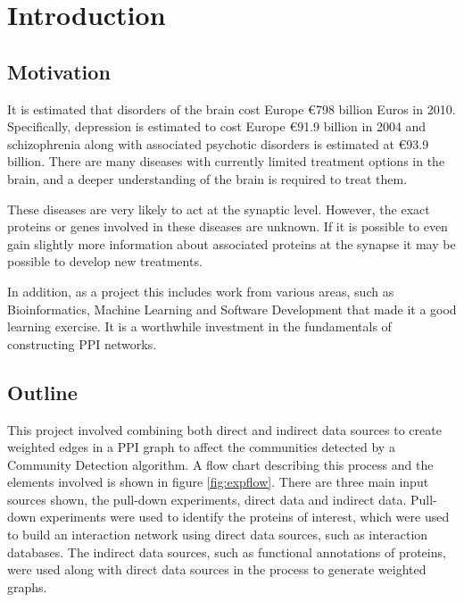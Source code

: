 \chapter{Introduction}
\label{introduction}



\section{Motivation}

It is estimated that disorders of the brain cost Europe €798 billion Euros in 2010\autocite{olesen_economic_2012}.
Specifically, depression is estimated to cost Europe €91.9 billion in 2004 and schizophrenia along with associated psychotic disorders is estimated at €93.9 billion.
There are many diseases with currently limited treatment options in the brain, and a deeper understanding of the brain is required to treat them. 


These diseases are very likely to act at the synaptic level\autocites{chua_architecture_2010,synsys}.
However, the exact proteins or genes involved in these diseases are unknown.
If it is possible to even gain slightly more information about associated proteins at the synapse it may be possible to develop new treatments\autocite{li_interaction_2010}.

In addition, as a project this includes work from various areas, such as Bioinformatics, Machine Learning and Software Development that made it a good learning exercise. %
It is a worthwhile investment in the fundamentals of constructing PPI networks. %

\section{Outline}

This project involved combining both direct and indirect data sources to create weighted edges in a PPI graph to affect the communities detected by a Community Detection algorithm.
A flow chart describing this process and the elements involved is shown in figure \ref{fig:expflow}.
There are three main input sources shown, the pull-down experiments, direct data and indirect data.
Pull-down experiments were used to identify the proteins of interest, which were used to build an interaction network using direct data sources, such as interaction databases.
The indirect data sources, such as functional annotations of proteins, were used along with direct data sources in the process to generate weighted graphs.

